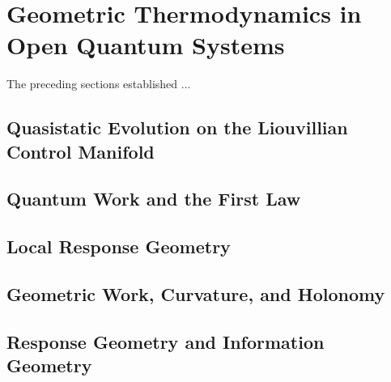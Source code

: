 \section{Geometric Thermodynamics in Open Quantum Systems}
\label{sec:oqs}
The preceding sections established ...
\subsection{Quasistatic Evolution on the Liouvillian Control Manifold}
\subsection{Quantum Work and the First Law}
\subsection{Local Response Geometry}
%
%
%
%
%
%
%
\subsection{Geometric Work, Curvature, and Holonomy}
%
%
%
%
%
\subsection{Response Geometry and Information Geometry}
%
%
%
%
%
%
%
